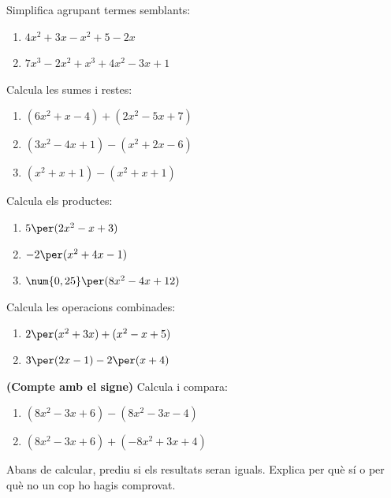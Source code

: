 \begin{exercicis}
\begin{exlist}
  \item Simplifica agrupant termes semblants:
    \begin{enumerate}[label=\alph*), leftmargin=1.6em, topsep=2pt]
      \item $4x^2 + 3x - x^2 + 5 - 2x$
      \item $7x^3 - 2x^2 + x^3 + 4x^2 - 3x + 1$
    \end{enumerate}

  \item Calcula les sumes i restes:
    \begin{enumerate}[label=\alph*), leftmargin=1.6em, topsep=2pt]
      \item $(6x^2 + x - 4) + (2x^2 - 5x + 7)$
      \item $(3x^2 - 4x + 1) - (x^2 + 2x - 6)$
      \item $(x^2 + x + 1) - (x^2 + x + 1)$
    \end{enumerate}

  \item Calcula els productes:
    \begin{enumerate}[label=\alph*), leftmargin=1.6em, topsep=2pt]
      \item $5\per(2x^2 - x + 3)$
      \item $-2\per(x^2 + 4x - 1)$
      \item $\num{0,25}\per(8x^2 - 4x + 12)$
    \end{enumerate}

  \item Calcula les operacions combinades:
    \begin{enumerate}[label=\alph*), leftmargin=1.6em, topsep=2pt]
      \item $2\per(x^2 + 3x) + (x^2 - x + 5)$
      \item $3\per(2x - 1) - 2\per(x + 4)$
    \end{enumerate}

  \item \textbf{(Compte amb el signe)} Calcula i compara:
    \begin{enumerate}[label=\alph*), leftmargin=1.6em, topsep=2pt]
      \item $(8x^2 - 3x + 6) - (8x^2 - 3x - 4)$
      \item $(8x^2 - 3x + 6) + (-8x^2 + 3x + 4)$
    \end{enumerate}
    Abans de calcular, prediu si els resultats seran iguals. Explica per
    què sí o per què no un cop ho hagis comprovat.


\end{exlist}
\end{exercicis}
